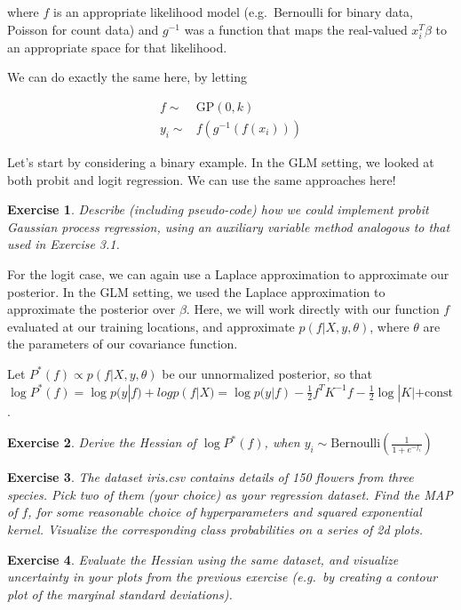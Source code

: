 \documentclass[twoside]{article}
\newcounter{lecnum}
\newtheorem{exercise}{Exercise}[lecnum]
\begin{document}
 where $f$ is an appropriate likelihood model (e.g.\ Bernoulli for binary data, Poisson for count data) and $g^{-1}$ was a function that maps the real-valued $x_i^T\beta$ to an appropriate space for that likelihood.


 We can do exactly the same here, by letting

 $$\begin{aligned}f \sim& \mbox{GP}(0, k)\\
   y_i \sim&f(g^{-1}(f(x_i)))\end{aligned}
 $$


 Let's start by considering a binary example. In the GLM setting, we looked at both probit and logit regression. We can use the same approaches here!

 \begin{exercise}
   Describe (including pseudo-code) how we could implement probit Gaussian process regression, using an auxiliary variable method analogous to that used in Exercise 3.1.
 \end{exercise}

 For the logit case, we can again use a Laplace approximation to approximate our posterior. In the GLM setting, we used the Laplace approximation to approximate the posterior over $\beta$. Here, we will work directly with our function $f$ evaluated at our training locations, and approximate $p(f|X,y,\theta)$, where $\theta$ are the parameters of our covariance function.

 Let $P^*(f)\propto p(f|X,y,\theta)$ be our unnormalized posterior, so that $\log P^*(f) = \log p(y|f) + log p(f|X) = \log p(y|f) -\frac{1}{2}f^TK^{-1}f - \frac{1}{2}\log|K| + \mbox{const}$.

 \begin{exercise}
   Derive the Hessian of $\log P^*(f)$, when $y_i \sim \mbox{Bernoulli}\left(\frac{1}{1+e^{-f_i}}\right)$
 \end{exercise}

 \begin{exercise}
   The dataset iris.csv contains details of 150 flowers from three species. Pick two of them (your choice) as your regression dataset. Find the MAP of $f$, for some reasonable choice of hyperparameters and squared exponential kernel. Visualize the corresponding class probabilities on a series of 2d plots.
 \end{exercise}

 \begin{exercise}
   Evaluate the Hessian using the same dataset, and visualize uncertainty in your plots from the previous exercise (e.g.\ by creating a contour plot of the marginal standard deviations).
   \end{exercise}
\end{document}
